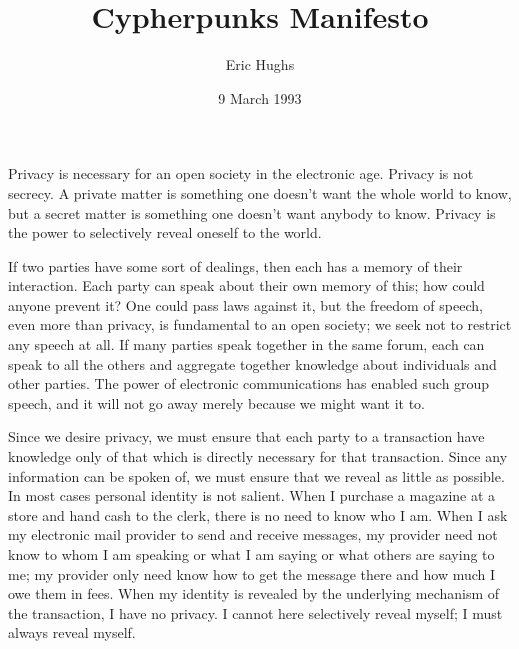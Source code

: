 \documentclass[statementpaper,oneside,article,14pt]{memoir}
\newcommand{\BackgroundPic}[1]{%
\put(0,0){%
\parbox[b][\paperheight]{\paperwidth}{%
\vfill
\centering
{\transparent{0.4} \texttt{[image: \#1]}}%
\vfill
}}}
\begin{document}

\title{Cypherpunks Manifesto}
\author{Eric Hughs}
\date{9 March 1993}

\begingroup
\let\cleardoublepage\clearpage


\begin{titlingpage}
\maketitle


\end{titlingpage}

\endgroup

\pagestyle{empty}




 Privacy is necessary for an open society in the electronic age. Privacy is not secrecy. A private matter is something one doesn't want the whole world to know, but a secret matter is something one doesn't want anybody to know. Privacy is the power to selectively reveal oneself to the world.

If two parties have some sort of dealings, then each has a memory of their interaction. Each party can speak about their own memory of this; how could anyone prevent it? One could pass laws against it, but the freedom of speech, even more than privacy, is fundamental to an open society; we seek not to restrict any speech at all. If many parties speak together in the same forum, each can speak to all the others and aggregate together knowledge about individuals and other parties. The power of electronic communications has enabled such group speech, and it will not go away merely because we might want it to.

\newpage

Since we desire privacy, we must ensure that each party to a transaction have knowledge only of that which is directly necessary for that transaction. Since any information can be spoken of, we must ensure that we reveal as little as possible. In most cases personal identity is not salient. When I purchase a magazine at a store and hand cash to the clerk, there is no need to know who I am. When I ask my electronic mail provider to send and receive messages, my provider need not know to whom I am speaking or what I am saying or what others are saying to me; my provider only need know how to get the message there and how much I owe them in fees. When my identity is revealed by the underlying mechanism of the transaction, I have no privacy. I cannot here selectively reveal myself; I must always reveal myself. 
\end{document}
